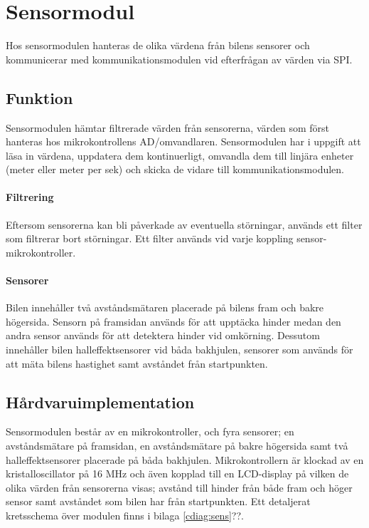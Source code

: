 \documentclass[tekniskrapport/tech.tex]{subfiles}
\begin{document}
\section{Sensormodul}
Hos sensormodulen hanteras de olika värdena från bilens sensorer och kommunicerar med kommunikationsmodulen vid efterfrågan av värden via SPI.

\subsection{Funktion}
Sensormodulen hämtar filtrerade värden från sensorerna, värden som först hanteras hos mikrokontrollens AD/omvandlaren. Sensormodulen har i uppgift att läsa in värdena, uppdatera dem kontinuerligt, omvandla dem till linjära enheter (meter  eller meter per sek) och skicka de vidare till kommunikationsmodulen.

\paragraph{Filtrering} Eftersom sensorerna kan bli påverkade av eventuella
störningar, används ett filter som filtrerar bort störningar. Ett filter används vid varje koppling sensor-mikrokontroller.

\paragraph{Sensorer} Bilen innehåller två avståndsmätaren placerade på bilens fram och bakre högersida. Sensorn på framsidan används för att upptäcka hinder medan den andra sensor används för att detektera hinder vid omkörning. Dessutom innehåller bilen halleffektsensorer vid båda bakhjulen, sensorer som används för att mäta bilens hastighet samt avståndet från startpunkten.

\subsection{Hårdvaruimplementation} Sensormodulen består av en mikrokontroller, och fyra sensorer; en avståndsmätare på framsidan, en avståndsmätare på bakre högersida samt två halleffektsensorer placerade på båda bakhjulen. Mikrokontrollern är klockad av en kristalloscillator på 16 MHz och även kopplad till en LCD-display på vilken de olika värden från sensorerna visas; avstånd till hinder från både fram och höger sensor samt avståndet som bilen har från startpunkten. Ett detaljerat kretsschema över modulen finns i bilaga
\ref{cdiag:sens}??.
\end{document}
